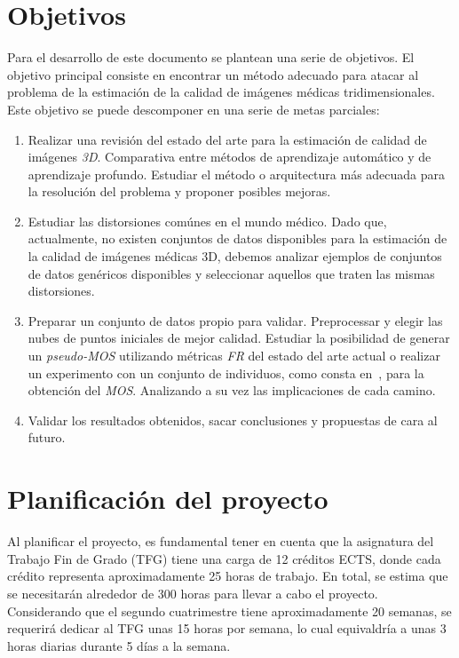 \section{Objetivos}
Para el desarrollo de este documento se plantean una serie de objetivos. 
El objetivo principal consiste en encontrar un método adecuado para atacar al 
problema de la estimación de la calidad de imágenes médicas tridimensionales. 
Este objetivo se puede descomponer en una serie de metas parciales: 
\begin{enumerate}
  \item Realizar una revisión del estado del arte para la estimación de calidad 
    de imágenes \emph{3D}. Comparativa entre métodos de aprendizaje automático 
    y de aprendizaje profundo. Estudiar el método o arquitectura más adecuada 
    para la resolución del problema y proponer posibles mejoras. 
  \item Estudiar las distorsiones comúnes en el mundo médico. 
    Dado que, actualmente, no existen conjuntos de datos disponibles para la 
    estimación de la calidad de imágenes médicas 3D, debemos analizar ejemplos 
    de conjuntos de datos genéricos disponibles y 
    seleccionar aquellos que traten las mismas distorsiones. 
  \item Preparar un conjunto de datos propio para validar. Preprocessar y 
    elegir las nubes de puntos iniciales de mejor calidad. 
    Estudiar la posibilidad de generar un \emph{pseudo-MOS} 
    utilizando métricas \emph{FR} del estado del arte actual o 
    realizar un experimento con un conjunto de individuos, 
    como consta en~\cite{ITU-R.2012, ITU-r.2021},
    para la obtención del \emph{MOS}. 
    Analizando a su vez las implicaciones de cada camino.
  \item Validar los resultados obtenidos, sacar conclusiones y propuestas 
    de cara al futuro.
\end{enumerate}
\section{Planificación del proyecto}
Al planificar el proyecto, es fundamental tener en cuenta que la asignatura del 
Trabajo Fin de Grado (TFG) tiene una carga de 12 créditos ECTS, donde cada 
crédito representa aproximadamente 25 horas de trabajo. 
En total, se estima que se necesitarán alrededor de 300 horas para llevar a cabo 
el proyecto. Considerando que el segundo cuatrimestre tiene aproximadamente 20 semanas, 
se requerirá dedicar al TFG unas 15 horas por semana, lo cual equivaldría a unas 3 horas 
diarias durante 5 días a la semana.
 
